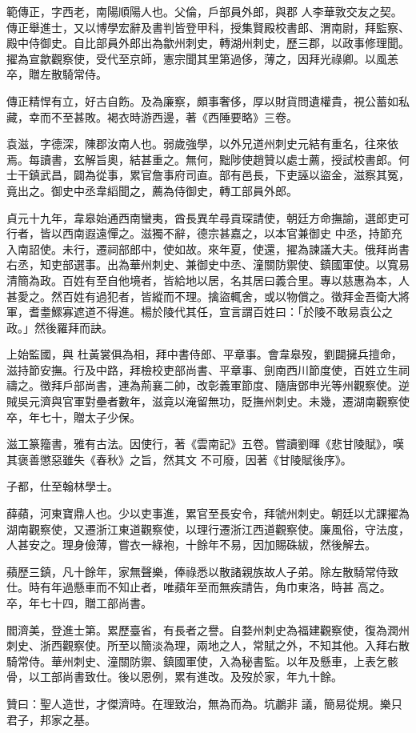 \begin{pinyinscope}
 範傳正，字西老，南陽順陽人也。父倫，戶部員外郎，與郡
 人李華敦交友之契。傳正舉進士，又以博學宏辭及書判皆登甲科，授集賢殿校書郎、渭南尉，拜監察、殿中侍御史。自比部員外郎出為歙州刺史，轉湖州刺史，歷三郡，以政事修理聞。擢為宣歙觀察使，受代至京師，憲宗聞其里第過侈，薄之，因拜光祿卿。以風恙卒，贈左散騎常侍。



 傳正精悍有立，好古自飭。及為廉察，頗事奢侈，厚以財貨問遺權貴，視公蓄如私藏，幸而不至甚敗。褐衣時游西邊，著《西陲要略》三卷。



 袁滋，字德深，陳郡汝南人也。弱歲強學，以外兄道州刺史元結有重名，往來依焉。每讀書，玄解旨奧，結甚重之。無何，黜陟使趙贊以處士薦，授試校書郎。何士干鎮武昌，闢為從事，累官詹事府司直。部有邑長，下吏誣以盜金，滋察其冤，竟出之。御史中丞韋縚聞之，薦為侍御史，轉工部員外郎。



 貞元十九年，韋皋始通西南蠻夷，酋長異牟尋貢琛請使，朝廷方命撫諭，選郎吏可行者，皆以西南遐遠憚之。滋獨不辭，德宗甚嘉之，以本官兼御史
 中丞，持節充入南詔使。未行，遷祠部郎中，使如故。來年夏，使還，擢為諫議大夫。俄拜尚書右丞，知吏部選事。出為華州刺史、兼御史中丞、潼關防禦使、鎮國軍使。以寬易清簡為政。百姓有至自他境者，皆給地以居，名其居曰義合里。專以慈惠為本，人甚愛之。然百姓有過犯者，皆縱而不理。擒盜輒舍，或以物償之。徵拜金吾衛大將軍，耆耋鰥寡遮道不得進。楊於陵代其任，宣言謂百姓曰：「於陵不敢易袁公之政。」然後羅拜而訣。



 上始監國，與
 杜黃裳俱為相，拜中書侍郎、平章事。會韋皋歿，劉闢擁兵擅命，滋持節安撫。行及中路，拜檢校吏部尚書、平章事、劍南西川節度使，百姓立生祠禱之。徵拜戶部尚書，連為荊襄二帥，改彰義軍節度、隨唐鄧申光等州觀察使。逆賊吳元濟與官軍對壘者數年，滋竟以淹留無功，貶撫州刺史。未幾，遷湖南觀察使卒，年七十，贈太子少保。



 滋工篆籀書，雅有古法。因使行，著《雲南記》五卷。嘗讀劉暉《悲甘陵賦》，嘆其褒善懲惡雖失《春秋》之旨，然其文
 不可廢，因著《甘陵賦後序》。



 子都，仕至翰林學士。



 薛蘋，河東寶鼎人也。少以吏事進，累官至長安令，拜虢州刺史。朝廷以尤課擢為湖南觀察使，又遷浙江東道觀察使，以理行遷浙江西道觀察使。廉風俗，守法度，人甚安之。理身儉薄，嘗衣一綠袍，十餘年不易，因加賜硃紱，然後解去。



 蘋歷三鎮，凡十餘年，家無聲樂，俸祿悉以散諸親族故人子弟。除左散騎常侍致仕。時有年過懸車而不知止者，唯蘋年至而無疾請告，角巾東洛，時甚
 高之。卒，年七十四，贈工部尚書。



 閻濟美，登進士第。累歷臺省，有長者之譽。自婺州刺史為福建觀察使，復為潤州刺史、浙西觀察使。所至以簡淡為理，兩地之人，常賦之外，不知其他。入拜右散騎常侍。華州刺史、潼關防禦、鎮國軍使，入為秘書監。以年及懸車，上表乞骸骨，以工部尚書致仕。後以恩例，累有進改。及歿於家，年九十餘。



 贊曰：聖人造世，才傑濟時。在理致治，無為而為。坑鷫非
 議，簡易從規。樂只君子，邦家之基。



\end{pinyinscope}
